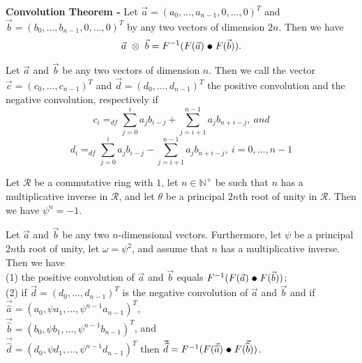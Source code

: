 \documentclass[a4paper]{article}
\begin{document}
\begin{theorem}
\textbf{Convolution Theorem -} Let $\vec{a} = (a_{0}, \ldots, a_{n-1}, 0, \ldots, 0)^{T}$ and $\vec{b} = (b_{0}, \ldots, b_{n-1}, 0, \ldots, 0)^{T}$ by any two vectors of dimension $2n$. Then we have
$$\vec{a}\ \otimes\ \vec{b} = F^{-1}(F(\vec{a})\ \tikz\draw[black,fill=black] (0,0) circle (.5ex);\ F(\vec{b})).$$
\end{theorem}


\begin{samepage}
\begin{definition}
Let $\vec{a}$ and $\vec{b}$ be any two vectors of dimension $n$. Then we call the vector $\vec{c} = (c_{0}, \ldots, c_{n-1})^{T}$ and $\vec{d} = (d_{0}, \ldots, d_{n-1})^{T}$ the positive convolution and the negative convolution, respectively if
$$c_{i} =_{df} \sum_{j=0}^{i}a_{j}b_{i-j} + \sum_{j=i+1}^{n-1}a_{j}b_{n+i-j},\ and$$
$$d_{i} =_{df} \sum_{j=0}^{i}a_{j}b_{i-j} - \sum_{j=i+1}^{n-1}a_{j}b_{n+i-j},\ i=0, \ldots, n - 1$$
\end{definition}
\end{samepage}


\begin{lemma}
Let $\mathcal{R}$ be a commutative ring with $1$, let $n \in \mathbb{N}^{+}$ be such that $n$ has a multiplicative inverse in $\mathcal{R}$, and let $\theta$ be a principal $2n$th root of unity in $\mathcal{R}$. Then we have $\psi^{n} = -1$.
\end{lemma}


\begin{theorem}
Let $\vec{a}$ and $\vec{b}$ be any two $n$-dimensional vectors. Furthermore, let $\psi$ be a principal $2n$th root of unity, let $\omega = \psi^{2}$, and assume that $n$ has a multiplicative inverse. Then we have \\
(1) the positive convolution of $\vec{a}$ and $\vec{b}$ equals $F^{-1}(F(\vec{a})\ \tikz\draw[black,fill=black] (0,0) circle (.5ex);\ F(\vec{b}))$; \\
(2) if $\vec{d} = (d_{0}, \ldots, d_{n-1})^{T}$ is the negative convolution of $\vec{a}$ and $\vec{b}$ and if $\vec{\widehat{a}} = (a_{0}, \psi a_{1}, \ldots, \psi^{n - 1}a_{n - 1})^{T}$, \\
$\vec{\widehat{b}} = (b_{0}, \psi b_{1}, \ldots, \psi^{n - 1}b_{n - 1})^{T}$, and \\
$\vec{\widehat{d}} = (d_{0}, \psi d_{1}, \ldots, \psi^{n - 1}d_{n - 1})^{T}$ then $\vec{\widehat{d}} = F^{-1}(F(\vec{\widehat{a}})\ \tikz\draw[black,fill=black] (0,0) circle (.5ex);\ F(\vec{\widehat{b}}))$.
\end{theorem}
\end{document}
